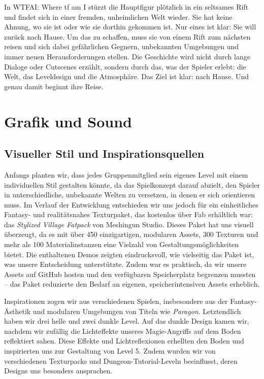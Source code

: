 \documentclass[oneside]{ausarbeitung}
\begin{document}
In WTFAI: Where tf am I stürzt die Hauptfigur plötzlich in ein seltsames Rift und findet sich in einer fremden, unheimlichen Welt wieder. Sie hat keine Ahnung, wo sie ist oder wie sie dorthin gekommen ist. Nur eines ist klar: Sie will zurück nach Hause. Um das zu schaffen, muss sie von einem Rift zum nächsten reisen und sich dabei gefährlichen Gegnern, unbekannten Umgebungen und immer neuen Herausforderungen stellen. Die Geschichte wird nicht durch lange Dialoge oder Cutscenes erzählt, sondern durch das, was der Spieler erlebt: die Welt, das Leveldesign und die Atmosphäre. Das Ziel ist klar: nach Hause. Und genau damit beginnt ihre Reise.


\chapter{Grafik und Sound}
\label{cha:grafikundsound}

\section{Visueller Stil und Inspirationsquellen}
\label{sec:visuellerstilundinspirationsquellen}

Anfangs planten wir, dass jedes Gruppenmitglied sein eigenes Level mit einem individuellen Stil gestalten könnte, da das Spielkonzept darauf abzielt, den Spieler in unterschiedliche, unbekannte Welten zu versetzen, in denen er sich orientieren muss. Im Verlauf der Entwicklung entschieden wir uns jedoch für ein einheitliches Fantasy- und realitätsnahes Texturpaket, das kostenlos über Fab erhältlich war: das \textit{Stylized Village Fatpack} von Meshingun Studio. Dieses Paket hat uns visuell überzeugt, da es mit über 450 einzigartigen, modularen Assets, 300 Texturen und mehr als 100 Materialinstanzen eine Vielzahl von Gestaltungsmöglichkeiten bietet. Die enthaltenen Demos zeigten eindrucksvoll, wie vielseitig das Paket ist, was unsere Entscheidung unterstützte. Zudem war es praktisch, da wir unsere Assets auf GitHub hosten und den verfügbaren Speicherplatz begrenzen mussten – das Paket reduzierte den Bedarf an eigenen, speicherintensiven Assets erheblich.

Inspirationen zogen wir aus verschiedenen Spielen, insbesondere aus der Fantasy-Ästhetik und modularen Umgebungen von Titeln wie \textit{Paragon}. Letztendlich haben wir drei helle und zwei dunkle Level. Auf das dunkle Design kamen wir, nachdem wir zufällig die Lichteffekte unseres Magie-Angriffs auf dem Boden reflektiert sahen. Diese Effekte und Lichtreflexionen erhellten den Boden und inspirierten uns zur Gestaltung von Level 5. Zudem wurden wir von verschiedenen Texturpacks und Dungeon-Tutorial-Leveln beeinflusst, deren Designs uns besonders ansprachen.
\end{document}
